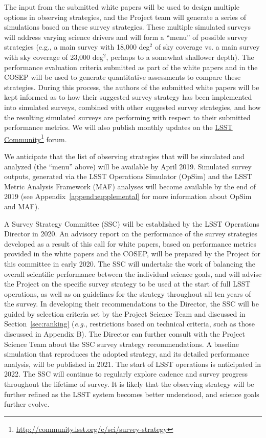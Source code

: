 \documentclass[DM,lsstdraft,toc,usenatbib]{lsstdoc}
\begin{document}
The input from the submitted white papers will be used to design multiple
options in observing strategies, and the Project team will generate a series of
simulations based on these survey strategies. These multiple simulated surveys will address 
varying science drivers and will form a ``menu'' of possible survey strategies (e.g., a main 
survey with 18,000 deg$^2$ of sky coverage vs. a main survey with sky coverage of 23,000 deg$^2$, perhaps to a
somewhat shallower depth). The performance evaluation criteria submitted as part of the 
white papers and in the COSEP will be used to generate quantitative assessments to compare these strategies.
During this process, the authors of the submitted white papers will be kept informed as to how 
their suggested survey strategy has been implemented into simulated surveys, combined with other suggested
survey strategies, and how the resulting simulated surveys are performing with respect to their submitted performance metrics.
We will also publish monthly updates on the \href{https://community.lsst.org/c/sci}{LSST Community}\footnote{\url{http://community.lsst.org/c/sci/survey-strategy}}
forum.

We anticipate that the list of observing strategies that will be simulated and analyzed 
(the ``menu'' above) will be available by April 2019. Simulated survey outputs, generated via the LSST 
Operations Simulator (OpSim) and the LSST Metric Analysis 
Framework (MAF) analyses will become available by the end 
of 2019 (see Appendix~\ref{append:supplemental} for more information about OpSim and MAF). 

A Survey Strategy Committee (SSC) will be established by the LSST Operations Director 
in 2020. An advisory report on the performance of the survey strategies developed as a result of this call for white papers, based on 
performance metrics provided in the white papers and the COSEP, will be prepared by the Project for this 
committee in early 2020. The SSC will undertake the work of balancing the overall scientific performance between the 
individual science goals, and will advise the Project on the specific survey strategy to be
used at the start of full LSST operations, as well as on guidelines for the strategy throughout all ten years of the survey. 
In developing their recommendations to the Director, the SSC will be guided by selection 
criteria set by the Project Science Team and discussed in Section~\ref{sec:ranking} ({\it e.g.}, restrictions 
based on technical criteria, such as those discussed in Appendix B). The Director can further consult with the Project Science 
Team about the SSC survey strategy recommendations. A baseline simulation that reproduces the
adopted strategy, and its detailed performance analysis, will be published in 2021. 
The start of LSST operations is anticipated in 2022. The SSC will continue to regularly explore 
cadence and survey progress throughout the lifetime of survey. It is likely that the observing
strategy will be further refined as the LSST system becomes better understood, and science goals 
further evolve.
\end{document}
